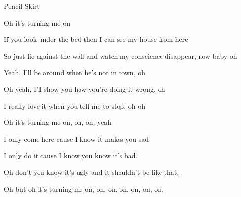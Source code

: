 \begin{song}{Pencil Skirt}{
	
	\chordset[Verse]{ \CMaj \AMaj \DMaj \GMaj }
	\chordset[Chorus]{ \EmShAm \CMajShE \DMajShA \GMajShE}
}
\begin{songchorus}
 
 Oh it's turning me on

\end{songchorus}


\begin{songverse}
 If you look under the bed then I can see my house from here

 So just lie against  the wall and watch my  conscience disappear, now baby oh


 Yeah, I'll be around when he's not in town, oh
 
 
 Oh yeah, I'll show you how you're doing it wrong, oh
 
 
 I really love it when you tell me to stop, oh oh
 
                  
 Oh it's turning me on, on, on, yeah

\end{songverse}


 \begin{songverse}[Bridge]

 \hspace{10pt}I only come here cause I know it makes you sad
 
 
 
 \hspace{10pt}I only do it cause I know you know it's bad.
 
 
 
 \hspace{10pt}Oh don't you know it's ugly and it shouldn't be like that.
 
                          
 \hspace{10pt}Oh but oh it's turning me on, on, on, on, on, on, on.


  \hspace{15pt}   \hspace{15pt}     \hspace{15pt}   
 \end{songverse}

\end{song}